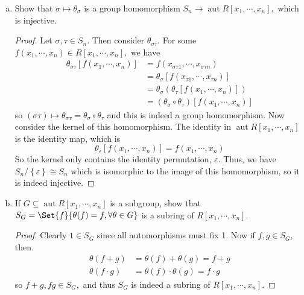 \documentclass{article}
\DeclareMathOperator{\aut}{aut}
\begin{document}
\begin{itemize}
\begin{enumerate}[(a)]
			\item Show that $\sigma\mapsto \theta_\sigma$ is a group homomorphism $S_n\to \aut R[x_1, \cdots, x_n],$ which is injective.
				\begin{proof}
					Let $\sigma, \tau\in S_n.$ Then consider $\theta_{\sigma\tau}.$ For some $f(x_1, \cdots, x_n)\in R[x_1, \cdots, x_n],$ we have
					\begin{align*}
						\theta_{\sigma\tau}\left[ f(x_1, \cdots, x_n) \right] &= f(x_{\sigma\tau 1}, \cdots, x_{\sigma\tau n}) \\
						&= \theta_\sigma\left[ f(x_{\tau1}, \cdots, x_{\tau n}) \right] \\
						&= \theta_\sigma(\theta_\tau\left[ f(x_1, \cdots, x_n) \right]) \\
						&= (\theta_\sigma \circ \theta_\tau)\left[ f(x_1, \cdots, x_n) \right]
					\end{align*}
					so $(\sigma\tau)\mapsto \theta_{\sigma\tau} = \theta_\sigma\circ\theta_\tau$ and this is indeed a group homomorphism. Now consider the kernel of this homomorphism. The identity in $\aut R[x_1, \cdots, x_n]$ is the identity map, which is
					\[\theta_\varepsilon\left[ f(x_1, \cdots, x_n) \right] = f(x_1, \cdots, x_n)\]
					So the kernel only contains the identity permutation, $\varepsilon.$ Thus, we have $S_n/\left\{ \varepsilon \right\} \cong S_n$ which is isomorphic to the image of this homomorphism, so it is indeed injective.
				\end{proof}

			\item If $G\subseteq \aut R[x_1, \cdots, x_n]$ is a subgroup, show that $S_G=\Set{f}{\theta(f)=f, \forall \theta\in G}$ is a subring of $R[x_1, \cdots, x_n].$
				\begin{proof}
					Clearly $1\in S_G$ since all automorphisms must fix 1. Now if $f, g\in S_G,$ then.
					\begin{align*}
						\theta(f+g) &= \theta(f) + \theta(g) = f + g \\
						\theta(f\cdot g) &= \theta(f)\cdot\theta(g) = f\cdot g
					\end{align*}
					so $f+g, fg\in S_G,$ and thus $S_G$ is indeed a subring of $R[x_1, \cdots, x_n].$
				\end{proof}
				
		\end{enumerate}
		
\end{itemize}
\end{document}
